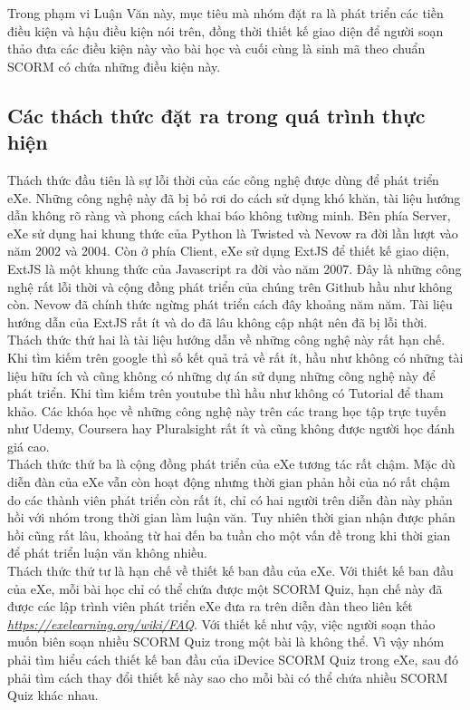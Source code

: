 	Trong phạm vi Luận Văn này, mục tiêu mà nhóm đặt ra là phát triển các tiền điều kiện và hậu điều kiện nói trên, đồng thời thiết kế giao diện để người soạn thảo đưa các điều kiện này vào bài học và cuối cùng là sinh mã theo chuẩn SCORM có chứa những điều kiện này.

	
\subsection{Các thách thức đặt ra trong quá trình thực hiện}

	Thách thức đầu tiên là sự lỗi thời của các công nghệ được dùng để phát triển eXe. Những công nghệ này đã bị bỏ rơi do cách sử dụng khó khăn, tài liệu hướng dẫn không rõ ràng và phong cách khai báo không tường minh. Bên phía Server, eXe sử dụng hai khung thức của Python là Twisted và Nevow ra đời lần lượt vào năm 2002 và 2004. Còn ở phía Client, eXe sử dụng ExtJS để thiết kế giao diện, ExtJS là một khung thức của Javascript ra đời vào năm 2007. Đây là những công nghệ rất lỗi thời và cộng đồng phát triển của chúng trên Github hầu như không còn. Nevow đã chính thức ngừng phát triển cách đây khoảng năm năm. Tài liệu hướng dẫn của ExtJS rất ít và do đã lâu không cập nhật nên đã bị lỗi thời. \\
	
	Thách thức thứ hai là tài liệu hướng dẫn về những công nghệ này rất hạn chế. Khi tìm kiếm trên google thì số kết quả trả về rất ít, hầu như không có những tài liệu hữu ích và cũng không có những dự án sử dụng những công nghệ này để phát triển. Khi tìm kiếm trên youtube thì hầu như không có Tutorial để tham khảo. Các khóa học về những công nghệ này trên các trang học tập trực tuyến như Udemy, Coursera hay Pluralsight rất ít và cũng không được người học đánh giá cao.\\

	Thách thức thứ ba là cộng đồng phát triển của eXe tương tác rất chậm. Mặc dù diễn đàn của eXe vẫn còn hoạt động nhưng thời gian phản hồi của nó rất chậm do các thành viên phát triển còn rất ít, chỉ có hai người trên diễn đàn này phản hồi với nhóm trong thời gian làm luận văn. Tuy nhiên thời gian nhận được phản hồi cũng rất lâu, khoảng từ hai đến ba tuần cho một vấn đề trong khi thời gian để phát triển luận văn không nhiều.\\
	
	Thách thức thứ tư là hạn chế về thiết kế ban đầu của eXe. Với thiết kế ban đầu của eXe, mỗi bài học chỉ có thể chứa được một SCORM Quiz, hạn chế này đã được các lập trình viên phát triển eXe đưa ra trên diễn đàn theo liên kết \textit{\href{https://exelearning.org/wiki/FAQ}{https://exelearning.org/wiki/FAQ}}. Với thiết kế như vậy, việc người soạn thảo muốn biên soạn nhiều SCORM Quiz trong một bài là không thể. Vì vậy nhóm phải tìm hiểu cách thiết kế ban đầu của iDevice SCORM Quiz trong eXe, sau đó phải tìm cách thay đổi thiết kế này sao cho mỗi bài có thể chứa nhiều SCORM Quiz khác nhau.\\
		


